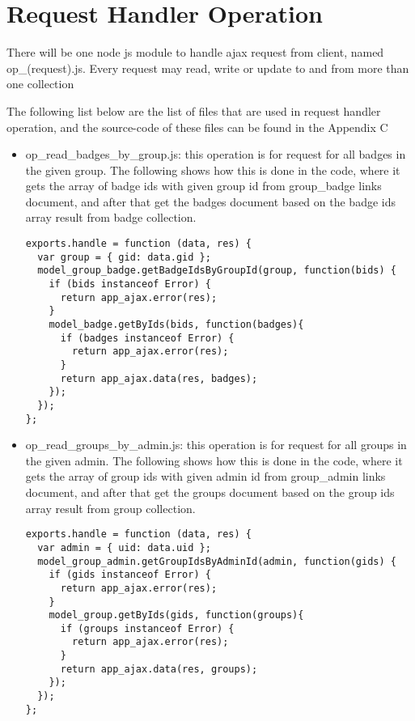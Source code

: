 \section{Request Handler Operation}
There will be one node js module to handle ajax request from client, named op{\_}(request).js. Every request may read, write or update to and from more than one collection

The following list below are the list of files that are used in request handler operation, and the source-code of these files can be found in the Appendix C

\begin{itemize}
\item op{\_}read{\_}badges{\_}by{\_}group.js: this operation is for request for all badges in the given group. The following shows how this is done in the code, where it gets the array of badge ids with given group id from group{\_}badge links document, and after that get the badges document based on the badge ids array result from badge collection. 

\begin{lstlisting}
exports.handle = function (data, res) {
  var group = { gid: data.gid };
  model_group_badge.getBadgeIdsByGroupId(group, function(bids) {
    if (bids instanceof Error) {
      return app_ajax.error(res);
    }
    model_badge.getByIds(bids, function(badges){
      if (badges instanceof Error) {
        return app_ajax.error(res);
      }
      return app_ajax.data(res, badges);
    });
  });
};
\end{lstlisting}

\item op{\_}read{\_}groups{\_}by{\_}admin.js: this operation is for request for all groups in the given admin. The following shows how this is done in the code, where it gets the array of group ids with given admin id from group{\_}admin links document, and after that get the groups document based on the group ids array result from group collection.

\begin{lstlisting}
exports.handle = function (data, res) {
  var admin = { uid: data.uid };
  model_group_admin.getGroupIdsByAdminId(admin, function(gids) {
    if (gids instanceof Error) {
      return app_ajax.error(res);
    }
    model_group.getByIds(gids, function(groups){
      if (groups instanceof Error) {
        return app_ajax.error(res);
      }
      return app_ajax.data(res, groups);
    });
  });
};
\end{lstlisting}


\end{itemize}
